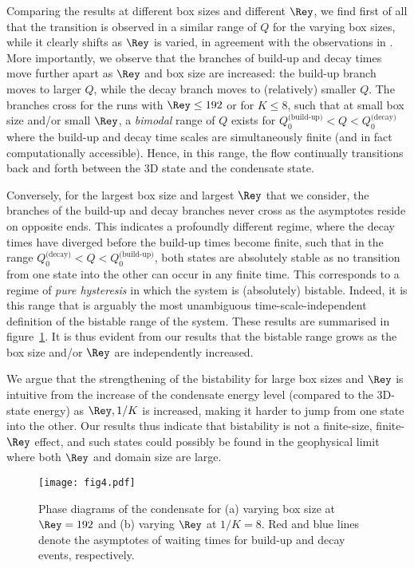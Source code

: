 \documentclass[]{jfm}
\begin{document}
Comparing the results at different box sizes and different $\Rey$, we find first of all that the transition is observed in a similar range of $Q$ for the varying box sizes, while it clearly shifts as $\Rey$ is varied, in agreement with the observations in \cite{VanKan2019}. More importantly, we observe that the branches of build-up and decay times move further apart as $\Rey$ and box size are increased: the build-up branch moves to larger $Q$, while the decay branch moves to (relatively) smaller $Q$. The branches cross for the runs with $\Rey\le 192$ or for $K\le 8$, such that at small box size and/or small $\Rey$, a \textit{bimodal} range of $Q$ exists for $Q_0^\textrm{(build-up)}<Q<Q_0^\textrm{(decay)}$ where the build-up and decay time scales are simultaneously finite (and in fact computationally accessible). Hence, in this range, the flow continually transitions back and forth between the 3D state and the condensate state. 

Conversely, for the largest box size and largest $\Rey$ that we consider, the branches of the build-up and decay branches never cross as the asymptotes reside on opposite ends. This indicates a profoundly different regime, where the decay times have diverged before the build-up times become finite, such that in the range $Q_0^\textrm{(decay)}<Q<Q_0^\textrm{(build-up)}$, both states are absolutely stable as no transition from one state into the other can occur in any finite time. This corresponds to a regime of \textit{pure hysteresis} in which the system is (absolutely) bistable. Indeed, it is this range that is arguably the most unambiguous time-scale-independent definition of the bistable range of the system. These results are summarised in figure~\ref{fig:phase_diagrams}. It is thus evident from our results that the bistable range grows as the box size and/or $\Rey$ are independently increased.

We argue that the strengthening of the bistability for large box sizes and $\Rey$ is intuitive from the increase of the condensate energy level (compared to the 3D-state energy) as $\Rey,1/K$ is increased, making it harder to jump from one state into the other. Our results thus indicate that bistability is not a finite-size, finite-$\Rey$ effect, and such states could possibly be found in the geophysical limit where both $\Rey$ and domain size are large.

\begin{figure}
    \centering
    \texttt{[image: fig4.pdf]}
    \caption{Phase diagrams of the condensate for (a) varying box size at $\Rey=192$ and (b) varying $\Rey$ at $1/K=8$. Red and blue lines denote the asymptotes of waiting times for build-up and decay events, respectively.}
    \label{fig:phase_diagrams}
\end{figure}
\end{document}
